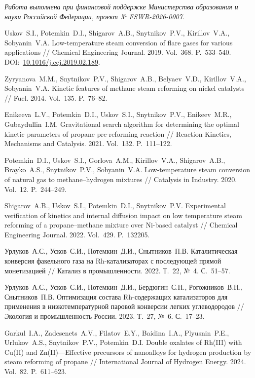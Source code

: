 \documentclass{cmi}
\begin{document}
\vspace{1em}
{\it Работа выполнена при финансовой поддержке Министерства образования и науки Российской Федерации, проект № FSWR-2026-0007.}


\begin{biblio}

Uskov~S.I., Potemkin~D.I., Shigarov~A.B., Snytnikov~P.V., Kirillov~V.A., Sobyanin~V.A. Low-temperature steam conversion of flare gases for various applications // Chemical Engineering Journal. 2019. Vol.~368. P.~533--540. DOI:~\href{http://dx.doi.org/10.1016/j.cej.2019.02.189}{10.1016/j.cej.2019.02.189}.

Zyryanova~M.M., Snytnikov~P.V., Shigarov~A.B., Belyaev~V.D., Kirillov~V.A., Sobyanin~V.A. Kinetic features of methane steam reforming on nickel catalysts // Fuel. 2014. Vol.~135. P.~76--82.

Enikeeva~L.V., Potemkin~D.I., Uskov~S.I., Snytnikov~P.V., Enikeev~M.R., Gubaydullin~I.M. Gravitational search algorithm for determining the optimal kinetic parameters of propane pre-reforming reaction // Reaction Kinetics, Mechanisms and Catalysis. 2021. Vol.~132. P.~111--122.

Potemkin~D.I., Uskov~S.I., Gorlova~A.M., Kirillov~V.A., Shigarov~A.B., Brayko~A.S., Snytnikov~P.V., Sobyanin~V.A. Low-temperature steam conversion of natural gas to methane--hydrogen mixtures // Catalysis in Industry. 2020. Vol.~12. P.~244--249.

Shigarov~A.B., Uskov~S.I., Potemkin~D.I., Snytnikov~P.V. Experimental verification of kinetics and internal diffusion impact on low temperature steam reforming of a propane--methane mixture over Ni-based catalyst // Chemical Engineering Journal. 2022. Vol.~429. P.~132205.

Урлуков~А.С., Усков~С.И., Потемкин~Д.И., Снытников~П.В. Каталитическая конверсия факельного газа на Rh-катализаторах с последующей прямой монетизацией // Катализ в промышленности. 2022. Т.~22, №~4. С.~51--57.

Урлуков~А.С., Усков~С.И., Потемкин~Д.И., Бердюгин~С.Н., Рогожников~В.Н., Снытников~П.В. Оптимизация состава Rh-содержащих катализаторов для применения в низкотемпературной паровой конверсии легких углеводородов // Экология и промышленность России. 2023. Т.~27, №~6. С.~17--23.

Garkul~I.A., Zadesenets~A.V., Filatov~E.Y., Baidina~I.A., Plyusnin~P.E., Urlukov~A.S., Snytnikov~P.V., Potemkin~D.I. Double oxalates of Rh(III) with Cu(II) and Zn(II)---Effective precursors of nanoalloys for hydrogen production by steam reforming of propane // International Journal of Hydrogen Energy. 2024. Vol.~82. P.~611--623.


\end{biblio}
\end{document}
